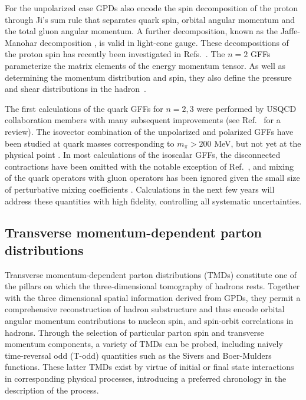 For the unpolarized case
GPDs also encode the spin decomposition of the proton through Ji's sum rule \cite{Ji:1996ek} that separates quark spin, orbital angular momentum and the total gluon angular momentum. 
A further decomposition, known as the Jaffe-Manohar decomposition \cite{Jaffe:1989jz}, is valid in light-cone gauge. These decompositions of the proton spin has recently been investigated in Refs.~\cite{Yang:2016plb,Alexandrou:2017oeh}.
The $n=2$ GFFs  parameterize the matrix elements of the energy momentum tensor. As well as determining the momentum distribution and spin, they 
also define the pressure and shear distributions in the hadron~\cite{Polyakov:2018zvc}.

The first calculations of the quark GFFs for $n=2,3$ were performed by USQCD collaboration members \cite{Hagler:2003jd} with many subsequent improvements (see Ref.~\cite{Hagler:2009mb} for a review). The isovector combination of the unpolarized and polarized GFFs have been studied at quark masses corresponding to $m_\pi>200$ MeV, but not yet at the physical point \cite{Syritsyn:2011vk,Bali:2013dpa,Hagler:2007xi,Bratt:2010jn,Sternbeck:2012rw,Brommel:2007sb,Gockeler:2003jfa,Alexandrou:2011nr}. In most calculations of the isoscalar GFFs, the disconnected contractions have been omitted with the notable exception of Ref.~\cite{Deka:2013zha}, and mixing of the quark operators with gluon operators has been ignored given the small size of perturbative mixing coefficients \cite{Alexandrou:2016ekb}.  Calculations in the next few years will address these quantities with high fidelity, controlling all systematic uncertainties.


\subsection{Transverse momentum-dependent parton distributions}
\label{TMDs}

Transverse momentum-dependent parton distributions  \cite{Boer:2011fh} (TMDs)
constitute one of the pillars on which the three-dimensional tomography of
hadrons rests. Together with the three dimensional spatial information
derived from GPDs, they permit a comprehensive reconstruction of hadron substructure and thus
encode orbital angular momentum contributions to nucleon spin, and
spin-orbit correlations in hadrons. Through the selection of
particular parton spin and transverse momentum components, a
variety of TMDs can be probed, including naively time-reversal odd
(T-odd) quantities such as the Sivers and Boer-Mulders functions.
These latter TMDs exist by virtue of initial or final state interactions
in corresponding physical processes, introducing a preferred chronology
in the description of the process.

